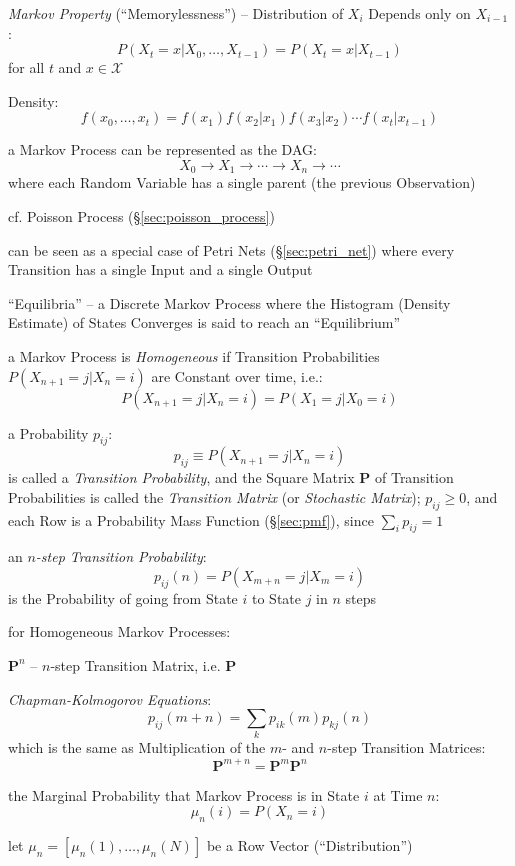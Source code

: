 \emph{Markov Property} (``Memorylessness'') --
Distribution of $X_i$ Depends only on $X_{i-1}$:
\[
  P(X_t = x | X_0, \ldots, X_{t-1}) = P(X_t = x | X_{t-1})
\]
for all $t$ and $x \in \mathcal{X}$

Density:
\[
  f(x_0, \ldots, x_t) = f(x_1)f(x_2|x_1)f(x_3|x_2) \cdots f(x_t|x_{t-1})
\]

a Markov Process can be represented as the DAG:
\[
  X_0 \longrightarrow X_1 \longrightarrow \cdots \longrightarrow X_n
    \longrightarrow \cdots
\]
where each Random Variable has a single parent (the previous Observation)

cf. Poisson Process (\S\ref{sec:poisson_process})

\fist can be seen as a special case of Petri Nets (\S\ref{sec:petri_net}) where
every Transition has a single Input and a single Output

``Equilibria'' -- a Discrete Markov Process where the Histogram (Density
Estimate) of States Converges is said to reach an ``Equilibrium''

a Markov Process is \emph{Homogeneous} if Transition Probabilities
$P(X_{n+1} = j | X_n = i)$ are Constant over time, i.e.:
\[
  P(X_{n+1} = j | X_n = i) = P(X_1 = j| X_0 = i)
\]

a Probability $p_{ij}$:
\[
  p_{ij} \equiv P(X_{n+1} = j | X_n = i)
\]
is called a \emph{Transition Probability}, and the Square Matrix $\mathbf{P}$ of
Transition Probabilities is called the \emph{Transition Matrix} (or
\emph{Stochastic Matrix});
$p_{ij} \geq 0$, and each Row is a Probability Mass Function (\S\ref{sec:pmf}),
since $\sum_i p_{ij} = 1$

an \emph{$n$-step Transition Probability}:
\[
  p_{ij}(n) = P(X_{m+n} = j | X_m = i)
\]
is the Probability of going from State $i$ to State $j$ in $n$ steps

for Homogeneous Markov Processes:

$\mathbf{P}^n$ -- $n$-step Transition Matrix, i.e. $\mathbf{P}$

\emph{Chapman-Kolmogorov Equations}:
\[
  p_{ij}(m + n) = \sum_k p_{ik}(m) p_{kj}(n)
\]
which is the same as Multiplication of the $m$- and $n$-step Transition
Matrices:
\[
  \mathbf{P}^{m+n} = \mathbf{P}^m \mathbf{P}^n
\]

the Marginal Probability that Markov Process is in State $i$ at Time $n$:
\[
  \mu_n(i) = P(X_n = i)
\]

let $\mu_n = [\mu_n(1), \ldots, \mu_n(N)]$ be a Row Vector (``Distribution'')


